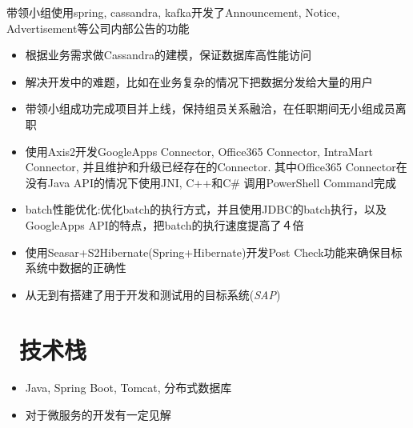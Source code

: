 \documentclass{resume}
\begin{document}
\begin{onehalfspacing}
带领小组使用spring, cassandra, kafka开发了Announcement, Notice, Advertisement等公司内部公告的功能
\begin{itemize}
  \item 根据业务需求做Cassandra的建模，保证数据库高性能访问
  \item 解决开发中的难题，比如在业务复杂的情况下把数据分发给大量的用户
  \item 带领小组成功完成项目并上线，保持组员关系融洽，在任职期间无小组成员离职
\end{itemize}
\end{onehalfspacing}

\begin{itemize}
  \item 使用Axis2开发GoogleApps Connector, Office365 Connector, IntraMart Connector, 并且维护和升级已经存在的Connector. 其中Office365 Connector在没有Java API的情况下使用JNI, C++和C\# 调用PowerShell Command完成
  \item batch性能优化:优化batch的执行方式，并且使用JDBC的batch执行，以及GoogleApps API的特点，把batch的执行速度提高了４倍
  \item 使用Seasar+S2Hibernate(Spring+Hibernate)开发Post Check功能来确保目标系统中数据的正确性
  \item 从无到有搭建了用于开发和测试用的目标系统(\textit{SAP})
\end{itemize}


\section{\faCogs\ 技术栈}
\begin{itemize}[parsep=0.5ex]
  \item Java, Spring Boot, Tomcat, 分布式数据库
  \item 对于微服务的开发有一定见解
\end{itemize}
\end{document}
